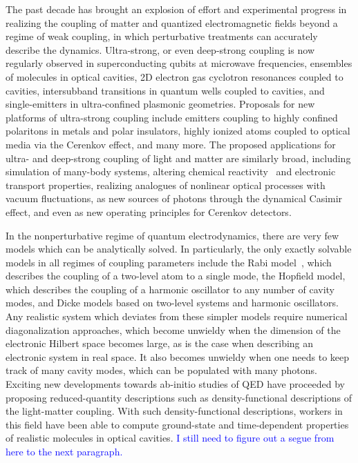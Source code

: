 \documentclass[aps,prb,twocolumn,
	groupedaddress,superscriptaddress,
	amsfonts,amssymb,amsmath,floatfix,
	citeautoscript]{revtex4-1}
\begin{document}
The past decade has brought an explosion of effort and experimental progress in realizing the coupling of matter and quantized electromagnetic fields beyond a regime of weak coupling, in which perturbative treatments can accurately describe the dynamics. Ultra-strong, or even deep-strong coupling is now regularly observed in superconducting qubits at microwave frequencies, ensembles of molecules in optical cavities, 2D electron gas cyclotron resonances coupled to cavities, intersubband transitions in quantum wells coupled to cavities, and single-emitters in ultra-confined plasmonic geometries. Proposals for new platforms of ultra-strong coupling include emitters coupling to highly confined polaritons in metals and polar insulators, highly ionized atoms coupled to optical media via the Cerenkov effect, and many more. The proposed applications for ultra- and deep-strong coupling of light and matter are similarly broad, including simulation of many-body systems, altering chemical reactivity~\cite{hutchison2012, thomas2016} and electronic transport properties, realizing analogues of nonlinear optical processes with vacuum fluctuations, as new sources of photons through the dynamical Casimir effect, and even as new operating principles for Cerenkov detectors.

In the nonperturbative regime of quantum electrodynamics, there are very few models which can be analytically solved. In particularly, the only exactly solvable models in all regimes of coupling parameters include the Rabi model~\cite{braak2011}, which describes the coupling of a two-level atom to a single mode, the Hopfield model, which describes the coupling of a harmonic oscillator to any number of cavity modes, and Dicke models based on two-level systems and harmonic oscillators. Any realistic system which deviates from these simpler models require numerical diagonalization approaches, which become unwieldy when the dimension of the electronic Hilbert space becomes large, as is the case when describing an electronic system in real space. It also becomes unwieldy when one needs to keep track of many cavity modes, which can be populated with many photons. Exciting new developments towards ab-initio studies of QED have proceeded by proposing reduced-quantity descriptions such as density-functional descriptions of the light-matter coupling. With such density-functional descriptions, workers in this field have been able to compute ground-state and time-dependent properties of realistic molecules in optical cavities. \textcolor{blue}{I still need to figure out a segue from here to the next paragraph.}
\end{document}
